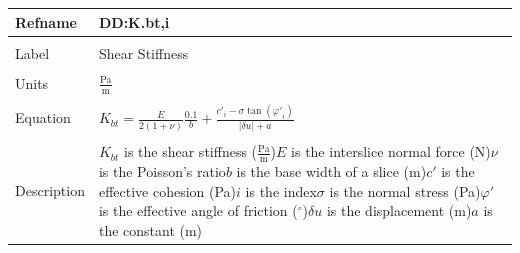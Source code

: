 \documentclass[12pt]{article}
\begin{document}
\noindent \begin{minipage}{\textwidth}
\begin{tabular}{p{} p{}}
\toprule \textbf{Refname} & \textbf{DD:K.bt,i}
\label{DD:K.bt,i}
\\ \midrule \\
Label & Shear Stiffness
\\ \midrule \\
Units & $\frac{\text{Pa}}{\text{m}}$
\\ \midrule \\
Equation & ${K_{bt}}=\frac{E}{2 \left(1+\nu{}\right)} \frac{0.1}{b}+\frac{{c'}_{i}-\sigma{} \tan\left({\varphi{}'}_{i}\right)}{|\delta{}u|+a}$
\\ \midrule \\
Description & ${K_{bt}}$ is the shear stiffness ($\frac{\text{Pa}}{\text{m}}$)\newline$E$ is the interslice normal force (N)\newline$\nu{}$ is the Poisson's ratio\newline$b$ is the base width of a slice (m)\newline$c'$ is the effective cohesion (Pa)\newline$i$ is the index\newline$\sigma{}$ is the normal stress (Pa)\newline$\varphi{}'$ is the effective angle of friction (${}^{\circ}$)\newline$\delta{}u$ is the displacement (m)\newline$a$ is the constant (m)
\\ \bottomrule \end{tabular}
\end{minipage}\\
~\newline
\end{document}
